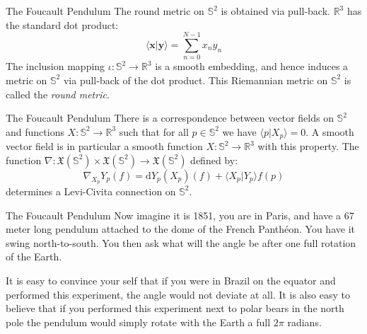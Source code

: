 \documentclass{beamer}
\begin{document}
    \begin{frame}{The Foucault Pendulum}
        The round metric on $\mathbb{S}^{2}$ is obtained via pull-back.
        $\mathbb{R}^{3}$ has the standard dot product:
        \begin{equation}
            \langle\mathbf{x}|\mathbf{y}\rangle
                =\sum_{n=0}^{N-1}{x}_{n}{y}_{n}
        \end{equation}
        The inclusion mapping $\iota:\mathbb{S}^{2}\rightarrow\mathbb{R}^{3}$
        is a smooth embedding, and hence induces a metric on $\mathbb{S}^{2}$
        via pull-back of the dot product. This Riemannian metric on
        $\mathbb{S}^{2}$ is called the \textit{round metric}.
    \end{frame}
    \begin{frame}{The Foucault Pendulum}
        There is a correspondence between vector fields on $\mathbb{S}^{2}$ and
        functions $X:\mathbb{S}^{2}\rightarrow\mathbb{R}^{3}$ such that
        for all $p\in\mathbb{S}^{2}$ we have
        $\langle{p}|X_{p}\rangle=0$. A smooth vector field is in particular a
        smooth function $X:\mathbb{S}^{2}\rightarrow\mathbb{R}^{3}$ with this
        property. The function
        $\nabla:\mathfrak{X}(\mathbb{S}^{2})\times\mathfrak{X}(\mathbb{S}^{2})%
            \rightarrow\mathfrak{X}(\mathbb{S}^{2})$ defined by:
        \begin{equation}
            \nabla_{X_{p}}Y_{p}(f)=
            \textrm{d}Y_{p}(X_{p})(f)+\langle{X}_{p}|Y_{p}\rangle{f}(p)
        \end{equation}
        determines a Levi-Civita connection on $\mathbb{S}^{2}$.
    \end{frame}
    \begin{frame}{The Foucault Pendulum}
        Now imagine it is 1851, you are in Paris, and have a 67 meter long
        pendulum attached to the dome of the French Panth\'{e}on. You have it
        swing north-to-south. You then ask what will the angle be after one
        full rotation of the Earth.
        \par\hfill\par
        It is easy to convince your self that if you were in Brazil on the
        equator and performed this experiment, the angle would not deviate at
        all. It is also easy to believe that if you performed this experiment
        next to polar bears in the north pole the pendulum would simply rotate
        with the Earth a full $2\pi$ radians.
    \end{frame}
\end{document}

